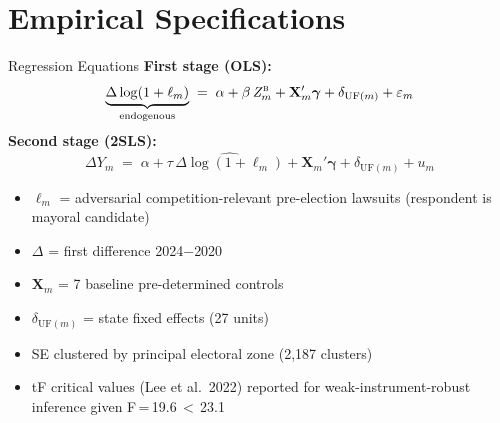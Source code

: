 \documentclass[aspectratio=169,10pt]{beamer}
\newcommand{\bZ}{\mathit{Z}_{m}^{\textsc{b}}}
\begin{document}
\section{Empirical Specifications}

\begin{frame}{Regression Equations}
\textbf{First stage (OLS):}
\[
\underbrace{\Delta\log(1+\ell_{m})}_{\text{endogenous}} \;=\; \alpha + \beta\, \bZ + \mathbf{X}_m'\boldsymbol{\gamma} + \delta_{\text{UF}(m)} + \varepsilon_m
\]
\bigskip
\textbf{Second stage (2SLS):}
\[
\Delta Y_m \;=\; \alpha + \tau\, \widehat{\Delta\log(1+\ell_{m})} + \mathbf{X}_m'\boldsymbol{\gamma} + \delta_{\text{UF}(m)} + u_m
\]
\bigskip
\begin{itemize}
  \item $\ell_m$ = adversarial competition-relevant pre-election lawsuits (respondent is mayoral candidate)
  \item $\Delta$ = first difference 2024$-$2020
  \item $\mathbf{X}_m$ = 7 baseline pre-determined controls
  \item $\delta_{\text{UF}(m)}$ = state fixed effects (27 units)
  \item SE clustered by principal electoral zone (2,187 clusters)
  \item tF critical values (Lee et al.\ 2022) reported for weak-instrument-robust inference given F\,=\,19.6\,$<$\,23.1
\end{itemize}
\end{frame}
\end{document}
